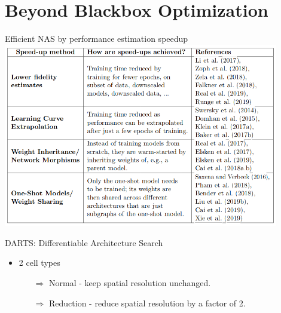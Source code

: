 \section{Beyond Blackbox Optimization}
\begin{frame}[c]{Efficient NAS by performance estimation speedup}
\centering
\includegraphics[width=0.9\textwidth]{images_lec7/performance_estimation.png}\\
\end{frame}
\begin{frame}[c]{DARTS: Differentiable Architecture Search }

	\begin{itemize}

	\item 2 cell types
	\begin{itemize}
            \item[$\Rightarrow$] \alert{Normal} - keep spatial resolution unchanged.
            \item[$\Rightarrow$] \alert{Reduction} - reduce spatial resolution by a factor of 2.
        \end{itemize}
	\end{itemize}
	
\end{frame}

